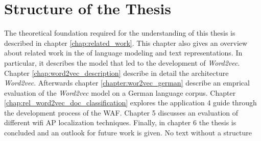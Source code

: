 \section{Structure of the Thesis}
\label{sec:structure-thesis}

The theoretical foundation required for the understanding of this thesis is
described in chapter \ref{chap:related_work}. This chapter also gives an
overview about related work in the of language modeling and text
representations.  In particular, it describes the model that led to the
development of \textit{Word2vec}.
 Chapter \ref{chap:word2vec_description} describe in detail the architecture
 \textit{Word2vec}. Afterwards chapter \ref{chapter:wor2vec_german} describe
 an emprical evaluation of the \textit{Word2vec} model on a German language
 corpus.  Chapter \ref{chap:rel_word2vec_doc_classification} explores the
 application  
4 guide through the development process of the WAF. Chapter 5 discusses an evaluation of different wifi AP localization techniques. Finally, in chapter 6 the thesis is concluded and an outlook for future work is given.
No text without a structure




 



